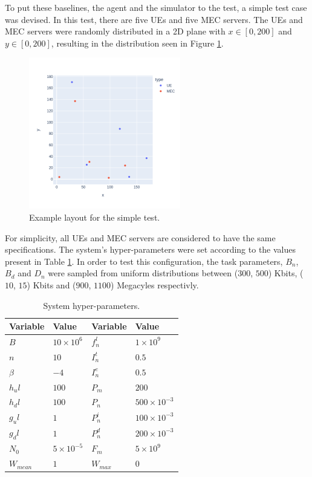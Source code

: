To put these baselines, the agent and the simulator to the test, a simple test case was devised. In this test, there are five \acrshort{UE}s and five \acrshort{MEC} servers. The UEs and MEC servers were randomly distributed in a 2D plane with $x \in [0, 200]$ and $y \in [0, 200]$, resulting in the distribution seen in Figure \ref{example_layout}.

\begin{figure}[H]
  \centering
  \includegraphics[width=250px]{images/example_layout.png}
  \caption{Example layout for the simple test.}  \label{example_layout}
\end{figure}

For simplicity, all \acrshort{UE}s and \acrshort{MEC} servers are considered to have the same specifications. The system's hyper-parameters were set according to the values present in Table \ref{hyperparams}. In order to test this configuration, the task parameters, $B_n$, $B_d$ and $D_n$ were sampled from uniform distributions between ($300$, $500$) Kbits, ($10$, $15$) Kbits and ($900$, $1100$) Megacyles respectivly. 

\begin{table}[H]
\centering
\begin{tabular}{|l|l|l|l|}
\hline
Variable             & Value & Variable                & Value \\ \hline
$B$&$10\times10^{6}$&$f_n^l$&$1\times10^{9}$\\
$n$&$10$&$I_n^t$&$0.5$\\
$\beta$&$-4$&$I_n^e$&$0.5$\\
$h_ul$&$100$& $P_m$&$200$\\
$h_dl$&$100$& $P_n$& $500\times10^{-3}$\\
$g_ul$&$1$&$P_n^i$&$100\times10^{-3}$\\
$g_dl$&$1$&$P_n^d$&$200\times10^{-3}$\\
$N_0$&$5\times10^{-5}$&$F_m$&$5\times10^{9}$\\
$W_{mean}$&$1$&$W_{max}$&$0$\\ \hline
\end{tabular}
\caption{System hyper-parameters.}\label{hyperparams}
\end{table}

